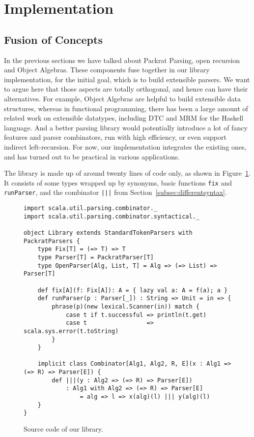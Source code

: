 \section{Implementation}\label{sec:implementation}

\subsection{Fusion of Concepts}\label{subsec:fusion}


In the previous sections we have talked about Packrat Parsing, open recursion and Object Algebras. These components fuse together in our library implementation, for the initial goal, which is to build extensible parsers. We want to argue here that those aspects are totally orthogonal, and hence can have their alternatives. For example, Object Algebras are helpful to build extensible data structures, whereas in functional programming, there has been a large amount of related work on extensible datatypes, including DTC and MRM for the Haskell language. And a better
parsing library would potentially introduce a lot of fancy features and parser combinators, run with high efficiency, or even support indirect left-recursion.
 For now, our implementation integrates the existing ones, and has turned out to be practical in various applications.

The library is made up of around twenty lines of code only, as shown in Figure~\ref{fig:sourcelibrary}. It consists of some types wrapped up by synonyms, basic functions \lstinline{fix} and \lstinline{runParser}, and the combinator \lstinline{|||} from Section~\ref{subsec:differentsyntax}.


\begin{figure}[htbp]
\centering
\begin{lstlisting}
import scala.util.parsing.combinator._
import scala.util.parsing.combinator.syntactical._

object Library extends StandardTokenParsers with PackratParsers {
    type Fix[T] = (=> T) => T
    type Parser[T] = PackratParser[T]
    type OpenParser[Alg, List, T] = Alg => (=> List) => Parser[T]

    def fix[A](f: Fix[A]): A = { lazy val a: A = f(a); a }
    def runParser(p : Parser[_]) : String => Unit = in => {
        phrase(p)(new lexical.Scanner(in)) match {
            case t if t.successful => println(t.get)
            case t                 => scala.sys.error(t.toString)
        }
    }

    implicit class Combinator[Alg1, Alg2, R, E](x : Alg1 => (=> R) => Parser[E]) {
        def |||(y : Alg2 => (=> R) => Parser[E])
            : Alg1 with Alg2 => (=> R) => Parser[E]
                = alg => l => x(alg)(l) ||| y(alg)(l)
    }
}
\end{lstlisting}
\caption{Source code of our library.}\label{fig:sourcelibrary}
\end{figure}

